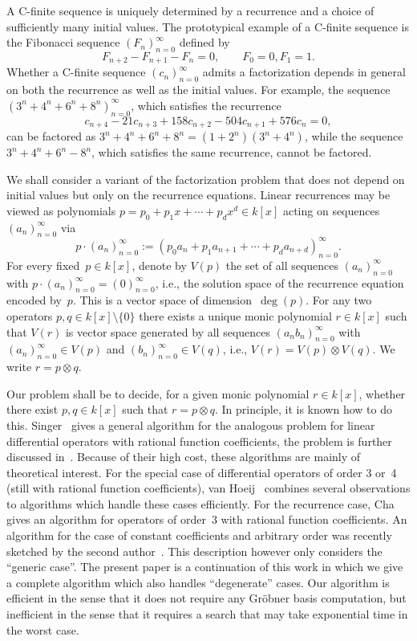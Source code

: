 \documentclass{sig-alternate}
\begin{document}
A C-finite sequence is uniquely determined by a recurrence and a choice
of sufficiently many initial values. The prototypical example of a C-finite
sequence is the Fibonacci sequence $(F_n)_{n=0}^\infty$ defined by
\[
 F_{n+2}-F_{n+1}-F_n=0,\qquad F_0=0,F_1=1.
\]
Whether a C-finite sequence $(c_n)_{n=0}^\infty$ admits a factorization depends
in general on both the recurrence as well as the initial values. For example,
the sequence $(3^n+4^n+6^n+8^n)_{n=0}^\infty$, which satisfies the recurrence
\[
 c_{n+4}-21c_{n+3}+158c_{n+2}-504c_{n+1}+576c_n=0,
\]
can be factored as $3^n+4^n+6^n+8^n=(1+2^n)(3^n+4^n)$, while the sequence
$3^n+4^n+6^n-8^n$, which satisfies the same recurrence, cannot be factored.

We shall consider a variant of the factorization problem that does not depend
on initial values but only on the recurrence equations. Linear recurrences
may be viewed as polynomials $p=p_0+p_1x+\cdots+p_dx^d\in k[x]$ acting on
sequences $(a_n)_{n=0}^\infty$ via
\[
  p\cdot(a_n)_{n=0}^\infty:=(p_0a_n+p_1a_{n+1}+\cdots+p_da_{n+d})_{n=0}^\infty.
\]
For every fixed~$p\in k[x]$, denote by $V(p)$ the set of all sequences
$(a_n)_{n=0}^\infty$ with $p\cdot(a_n)_{n=0}^\infty=(0)_{n=0}^\infty$, i.e., the solution
space of the recurrence equation encoded by~$p$.
This is a
vector space of dimension~$\deg(p)$. For any two operators $p,q\in k[x]\setminus\{0\}$ there
exists a unique monic polynomial $r\in k[x]$ such that $V(r)$ is
vector space generated by all sequences $(a_nb_n)_{n=0}^\infty$
with $(a_n)_{n=0}^\infty\in V(p)$ and $(b_n)_{n=0}^\infty\in V(q)$,
i.e., $V(r)=V(p)\otimes V(q)$. We write $r=p\otimes q$. 

Our problem shall be to decide, for a given monic polynomial $r\in k[x]$,
whether there exist $p,q\in k[x]$ such that $r=p\otimes q$. In principle, it is
known how to do this. Singer~\cite{singer85a} gives a general algorithm for the
analogous problem for linear differential operators with rational function
coefficients, the problem is further discussed in~\cite{hessinger97}. Because of their
high cost, these algorithms are mainly of theoretical interest. For the special
case of differential operators of order 3 or~4 (still with rational function
coefficients), van Hoeij~\cite{hoeij07,hoeij02a} combines several observations to 
algorithms which handle these cases efficiently. For the recurrence case,
Cha~\cite{cha14} gives an algorithm for operators of order~3 with rational function
coefficients. An algorithm for the case of constant coefficients and arbitrary
order was recently sketched by the second author~\cite{zeilberger13}. This description
however only considers the ``generic case''. The present paper is a
continuation of this work in which we give a complete algorithm which also
handles ``degenerate'' cases. Our algorithm is efficient in the sense that it
does not require any Gr\"obner basis computation, but inefficient in the sense
that it requires a search that may take exponential time in the worst
case. 
\end{document}
